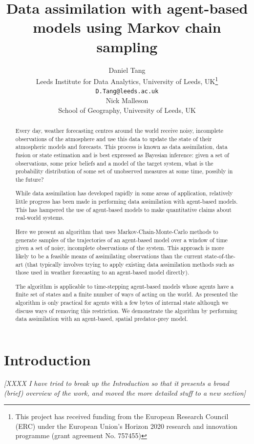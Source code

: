 \documentclass{article}
\title{Data assimilation with agent-based models using Markov chain sampling}
\author{
  Daniel Tang\\
    Leeds Institute for Data Analytics, University of Leeds, UK\thanks{This project has received funding from the European Research Council (ERC) under the European Union’s Horizon 2020 research and innovation programme (grant agreement No. 757455)}\\
  \texttt{D.Tang@leeds.ac.uk}\\
  \AND
  Nick Malleson\\
  School of Geography, University of Leeds, UK\\  
}
\begin{document}
\maketitle

\begin{abstract}
Every day, weather forecasting centres around the world receive noisy, incomplete observations of the atmosphere and use this data to update the state of their atmospheric models and forecasts. This process is known as data assimilation, data fusion or state estimation and is best expressed as Bayesian inference: given a set of observations, some prior beliefs and a model of the target system, what is the probability distribution of some set of unobserved measures at some time, possibly in the future?

While data assimilation has developed rapidly in some areas of application, relatively little progress has been made in performing data assimilation with agent-based models. This has hampered the use of agent-based models to make quantitative claims about real-world systems.

Here we present an algorithm that uses Markov-Chain-Monte-Carlo methods to generate samples of the trajectories of an agent-based model over a window of time given a set of noisy, incomplete observations of the system. This approach is more likely to be a feasible means of assimilating observations than the current state-of-the-art (that typically involves trying to apply existing data assimilation methods such as those used in weather forecasting to an agent-based model directly). 

The algorithm is applicable to time-stepping agent-based models whose agents have a finite set of states and a finite number of ways of acting on the world. As presented the algorithm is only practical for agents with a few bytes of internal state although we discuss ways of removing this restriction. We demonstrate the algorithm by performing data assimilation with an agent-based, spatial predator-prey model.
\end{abstract}


\section{Introduction}

\textit{[XXXX I have tried to break up the Introduction so that it presents a broad (brief) overview of the work, and moved the more detailed stuff to a new section]}
\end{document}
